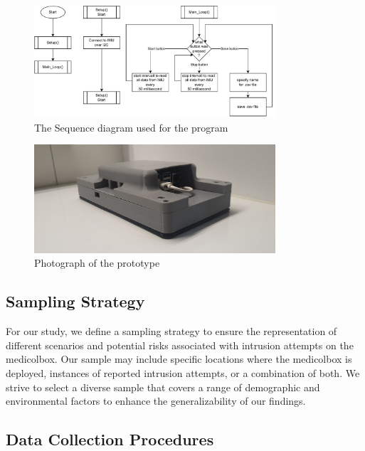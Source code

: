\documentclass[../main.tex]{subfiles}
\begin{document}
    \begin{figure}[htbp]
        \centering
        \includegraphics[width=0.8\textwidth]{resources/figures/sequence.drawio.pdf}
        \caption{The Sequence diagram used for the program}
        \label{fig:sequence_diagram}
    \end{figure}
    
    \begin{figure}[htbp]
        \centering
        \includegraphics[width=0.8\textwidth]{resources/images/prototype_image.jpg}
        \caption{Photograph of the prototype}
        \label{fig:prototype_image}
    \end{figure}

    \subsection{Sampling Strategy}

    For our study, we define a sampling strategy to ensure the
    representation of different scenarios and potential risks associated with
    \gls{intrusion} attempts on the \gls{medicolbox}.
    Our sample may include specific locations where the \gls{medicolbox} is deployed,
    instances of reported \gls{intrusion} attempts,
    or a combination of both. We strive to select a diverse sample that covers a range of
    demographic and environmental factors to enhance the generalizability of our findings.

    \subsection{Data Collection Procedures}
\end{document}
